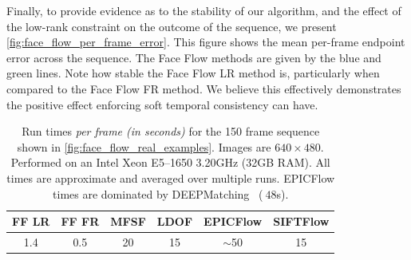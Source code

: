 Finally, to provide evidence as to the stability of our algorithm, and the effect
of the low-rank constraint on the outcome of the sequence, we present
\cref{fig:face_flow_per_frame_error}.
This figure shows the mean per-frame endpoint error across the sequence. The Face Flow
methods are given by the blue and green lines. Note how stable the Face Flow LR method is,
particularly when compared to the Face Flow FR method. We believe this effectively
demonstrates the positive effect enforcing soft temporal consistency can have.
\begin{table}[t]
    \centering
    \begin{tabular}{cccccc}
                                                     \toprule
FF LR & FF FR & MFSF & LDOF & EPICFlow & SIFTFlow \\ \toprule
1.4   & 0.5   & 20   & 15   & $\sim$50 & 15       \\ \bottomrule
    \end{tabular}
    \caption{Run times \textit{per frame (in seconds)} for the 150 frame
             sequence shown in \cref{fig:face_flow_real_examples}. Images are
             $640\times480$. Performed on an Intel Xeon E5--1650 3.20GHz
             (32GB RAM). All times are approximate and averaged over multiple
             runs. EPICFlow times are dominated by
             DEEPMatching~\cite{weinzaepfel2013deepflow} ($~48$s).}
\label{tbl:face_flow_run_times}
\end{table}
